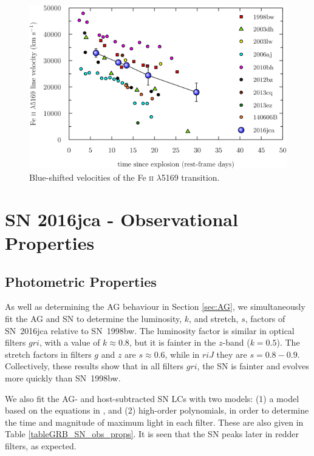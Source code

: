 \documentclass[traditabstract,longauth]{aa}
\begin{document}
\begin{figure}
   \includegraphics[width=\columnwidth]{Fig9_Line_vels-eps-converted-to.pdf}
      \caption{Blue-shifted velocities of the Fe \textsc{ii} $\lambda$5169 transition.}
   \label{FigLineVel}
\end{figure}









\section{SN 2016jca - Observational Properties}
\label{sec:SN_optical}




   
\subsection{Photometric Properties}
\label{sec:SN_optical_photo}


As well as determining the AG behaviour in Section \ref{sec:AG}, we simultaneously fit the AG and SN to determine the luminosity, $k$, and stretch, $s$, factors of SN~2016jca relative to SN~1998bw.  The luminosity factor is similar in optical filters $gri$, with a value of $k \approx 0.8$, but it is fainter in the $z$-band ($k=0.5$).  The stretch factors in filters $g$ and $z$ are $s\approx0.6$, while in $riJ$ they are $s=0.8-0.9$.  Collectively, these results show that in all filters $gri$, the SN is fainter and evolves more quickly than SN~1998bw.

We also fit the AG- and host-subtracted SN LCs with two models: (1) a model based on the equations in \citet{Bazin11}, and (2) high-order polynomials, in order to determine the time and magnitude of maximum light in each filter.  These are also given in Table \ref{tableGRB_SN_obs_props}.  It is seen that the SN peaks later in redder filters, as expected.
\end{document}
